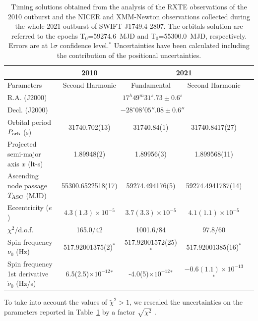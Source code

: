 \documentclass[fleqn,usenatbib]{mnras}
\newcommand{\swiftj}{SWIFT J1749.4-2807}
\newcommand{\nicer}{NICER}
\newcommand{\xmm}{XMM-Newton}
\newcommand{\rxte}{RXTE}
\begin{document}
\begin{table}

\begin{tabular}{l | c  c  c  c}
\hline
&  2010 & \multicolumn{2}{c}{2021} \\
\hline
Parameters   &    Second Harmonic      & Fundamental & Second Harmonic\\
\hline
\hline
R.A. (J2000) &  \multicolumn{3}{c}{$17^h49^m31^s.73\pm0.6^s$}\\
Decl. (J2000) & \multicolumn{3}{c}{$-28^\circ08'05''.08\pm0.6''$} \\
Orbital period $P_{\rm orb}$ (s) & 31740.702(13) & 31740.84(1) & 31740.8417(27)\\
Projected semi-major axis $x$ (lt-s) & 1.89948(2) & 1.89956(3) &1.899568(11) \\
Ascending node passage $T_{{\rm ASC}}$ (MJD) & 55300.6522518(17) & 59274.494176(5) & 59274.4941787(14)\\
Eccentricity ($e$) & $4.3(1.3)\times 10^{-5}$ & $3.7(3.3)\times 10^{-5}$ &$4.1(1.1)\times 10^{-5}$\\
$\chi^2$/d.o.f. & 165.0/42 & 1001.6/84 & 97.8/60\\
\hline
\hline
Spin frequency $\nu_0$ (Hz) & 517.92001375(2)$^*$ &517.92001572(25)$^*$& 517.92001385(16)$^*$\\
Spin frequency 1st derivative $\dot{\nu}_0$ (Hz/s) & 6.5(2.5)$\times 10^{-12}$$^*$ &-4.0(5)$\times 10^{-12}$$^*$&$-0.6(1.1)\times 10^{-13}$$^*$\\
\hline
\end{tabular}
\caption{Timing solutions obtained from the analysis of the \rxte{} observations of the 2010 outburst and the \nicer{} and \xmm{} observations collected during the whole 2021 outburst of \swiftj{}. The orbitals solution are  referred to the epochs T$_0$=59274.6~MJD and T$_0$=55300.0~MJD, respectively. Errors are at 1$\sigma$ confidence level.$^*$ Uncertainties have been calculated including the contribution of the positional uncertainties.}
\label{tab:solution}
\end{table}

To take into account the values of $\tilde{\chi}^2>1$, we rescaled the uncertainties on the parameters reported in Table~\ref{tab:solution} by a factor $\sqrt{\chi^2}$ \citep[see e.g.,][]{Finger:1999vb}.
\end{document}
